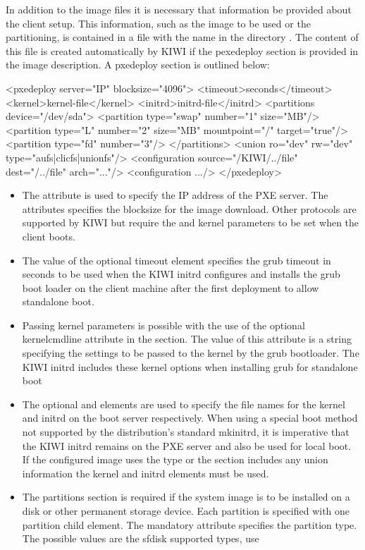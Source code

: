 \begin{itemize}
    In addition to the image files it is necessary that information be
    provided about the client setup. This information, such as the image
    to be used or the partitioning, is contained in a file with the name
     in the directory . The content
    of this file is created automatically by KIWI if the pexedeploy section
    is provided in the image description. A pxedeploy section is outlined
    below:

\begin{xml}
<pxedeploy server="IP" blocksize="4096">
  <timeout>seconds</timeout>
  <kernel>kernel-file</kernel>
  <initrd>initrd-file</initrd>
  <partitions device="/dev/sda">
    <partition type="swap" number="1" size="MB"/>
    <partition type="L" number="2" size="MB"
      mountpoint="/" target="true"/>
    <partition type="fd" number="3"/>
  </partitions>
  <union ro="dev" rw="dev" type="aufs|clicfs|unionfs"/>
  <configuration source="/KIWI/../file" dest="/../file"
                 arch="..."/>
  <configuration .../>
</pxedeploy>
\end{xml}

	\begin {itemize}
	\item The  attribute is used to specify the IP address
      of the PXE server. The  attributes specifies the
      blocksize for the image download. Other protocols are supported by
      KIWI but require the  and 
      kernel parameters to be set when the client boots.
	\item The value of the optional timeout element specifies the grub
      timeout in seconds to be used when the KIWI initrd configures and
      installs the grub boot loader on the client machine after the first
      deployment to allow standalone boot.
	\item Passing kernel parameters is possible with the use of the
      optional kernelcmdline attribute in the  section. The value
      of this attribute is a string specifying the settings to be
      passed to the kernel by the grub bootloader. The KIWI initrd
      includes these kernel options when installing grub for standalone boot
	\item The optional  and  elements are
      used to specify the file names for the kernel and initrd on the boot
      server respectively. When using a special boot method not supported
      by the distribution's standard mkinitrd, it is imperative that the
      KIWI initrd remains on the PXE server and also be used for local boot.
      If the configured image uses the  type or the 
      section includes any union information the kernel and initrd elements
      must be used.
	\item The partitions section is required if the system image is to be
      installed on a disk or other permanent storage device. Each partition
      is specified with one partition child element. The mandatory
       attribute specifies the partition type. The possible
      values are the sfdisk supported types, use
      

\end{itemize}
\end{itemize}
